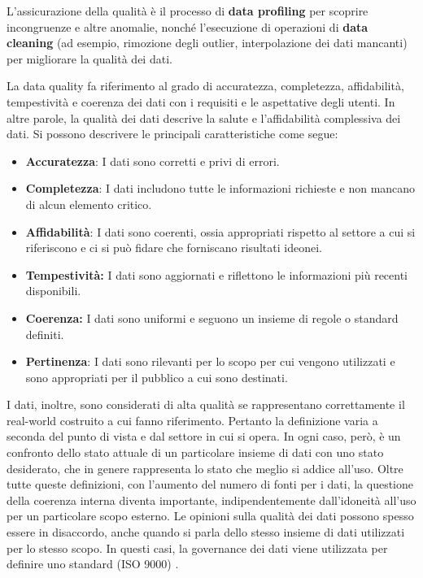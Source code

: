 L'assicurazione della qualità è il processo di \textbf{data profiling} per scoprire incongruenze e altre anomalie, nonché l'esecuzione di operazioni di \textbf{data cleaning}\cite{gao2016big} (ad esempio, rimozione degli outlier, interpolazione dei dati mancanti) per migliorare la qualità dei dati.

La data quality fa riferimento al grado di accuratezza, completezza, affidabilità, tempestività e coerenza dei dati con i requisiti e le aspettative degli utenti. In altre parole, la qualità dei dati descrive la salute e l'affidabilità complessiva dei dati.
Si possono descrivere le principali caratteristiche come segue: \cite{mcgilvray2021executing}

\begin{itemize}
	\item \textbf{Accuratezza}: I dati sono corretti e privi di errori.
	\item \textbf{Completezza}: I dati includono tutte le informazioni richieste e non mancano di alcun elemento critico.
	\item\textbf{ Affidabilità}: I dati sono coerenti, ossia appropriati rispetto al settore a cui si riferiscono e ci si può fidare che forniscano risultati ideonei.
	\item \textbf{Tempestività:} I dati sono aggiornati e riflettono le informazioni più recenti disponibili.
	\item \textbf{Coerenza:} I dati sono uniformi e seguono un insieme di regole o standard definiti.
	\item \textbf{Pertinenza}: I dati sono rilevanti per lo scopo per cui vengono utilizzati e sono appropriati per il pubblico a cui sono destinati.
\end{itemize} 

I dati, inoltre, sono considerati di alta qualità se rappresentano correttamente il real-world costruito a cui fanno riferimento. Pertanto la definizione varia a seconda del punto di vista e dal settore in cui si opera. In ogni caso, però,  è un confronto dello stato attuale di un  particolare insieme di dati con uno stato desiderato, che in genere rappresenta lo stato che meglio si addice all'uso.
Oltre tutte queste definizioni, con l'aumento del numero di fonti per i dati, la questione della coerenza interna diventa importante, indipendentemente dall'idoneità all'uso per un particolare scopo esterno. Le opinioni sulla qualità dei dati possono spesso essere in disaccordo, anche quando si parla dello stesso insieme di dati utilizzati per lo stesso scopo. In questi casi, la governance dei dati viene utilizzata per definire uno standard (ISO 9000) \cite{smallwood2019information}.

